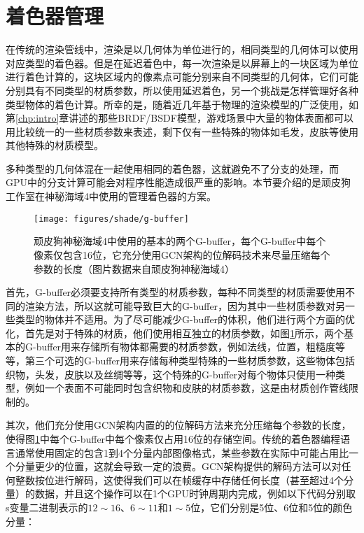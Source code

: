 \section{着色器管理}\label{sec:shade-deferred-custom-shader}
在传统的渲染管线中，渲染是以几何体为单位进行的，相同类型的几何体可以使用对应类型的着色器。但是在延迟着色中，每一次渲染是以屏幕上的一块区域为单位进行着色计算的，这块区域内的像素点可能分别来自不同类型的几何体，它们可能分别具有不同类型的材质参数，所以使用延迟着色，另一个挑战是怎样管理好各种类型物体的着色计算。所幸的是，随着近几年基于物理的渲染模型的广泛使用，如第\ref{chp:intro}章讲述的那些BRDF/BSDF模型，游戏场景中大量的物体表面都可以用比较统一的一些材质参数来表述，剩下仅有一些特殊的物体如毛发，皮肤等使用其他特殊的材质模型。

多种类型的几何体混在一起使用相同的着色器，这就避免不了分支的处理，而GPU中的分支计算可能会对程序性能造成很严重的影响。本节要介绍的是顽皮狗工作室在神秘海域4\cite{a:DeferredLightinginUncharted4}中使用的管理着色器的方案。

\begin{figure}
\begin{fullwidth}
	\texttt{[image: figures/shade/g-buffer]}
	\caption{顽皮狗神秘海域4中使用的基本的两个G-buffer，每个G-buffer中每个像素仅包含16位，它充分使用GCN架构的位解码技术来尽量压缩每个参数的长度（图片数据来自顽皮狗神秘海域4）}
	\label{f:shade-g-buffer} %
\end{fullwidth}
\end{figure}

首先，G-buffer必须要支持所有类型的材质参数，每种不同类型的材质需要使用不同的渲染方法，所以这就可能导致巨大的G-buffer，因为其中一些材质参数对另一些类型的物体并不适用。为了尽可能减少G-buffer的体积，他们进行两个方面的优化，首先是对于特殊的材质，他们使用相互独立的材质参数，如图\ref{f:shade-g-buffer}所示，两个基本的G-buffer用来存储所有物体都需要的材质参数，例如法线，位置，粗糙度等等，第三个可选的G-buffer用来存储每种类型特殊的一些材质参数，这些物体包括织物，头发，皮肤以及丝绸等等，这个特殊的G-buffer对每个物体只使用一种类型，例如一个表面不可能同时包含织物和皮肤的材质参数，这是由材质创作管线限制的。

其次，他们充分使用GCN架构内置的的位解码方法来充分压缩每个参数的长度，使得图\ref{f:shade-g-buffer}中每个G-buffer中每个像素仅占用16位的存储空间。传统的着色器编程语言通常使用固定的包含1到4个分量内部图像格式，某些参数在实际中可能占用比一个分量更少的位置，这就会导致一定的浪费。GCN架构提供的解码方法\cite{a:Low-levelShaderOptimizationforNext-GenandDX11}可以对任何整数按位进行解码，这使得我们可以在帧缓存中存储任何长度（甚至超过4个分量）的数据，并且这个操作可以在1个GPU时钟周期内完成，例如以下代码分别取s变量二进制表示的$12\sim 16$、$6 \sim 11$和$1\sim 5$位，它们分别是5位、6位和5位的颜色分量：

